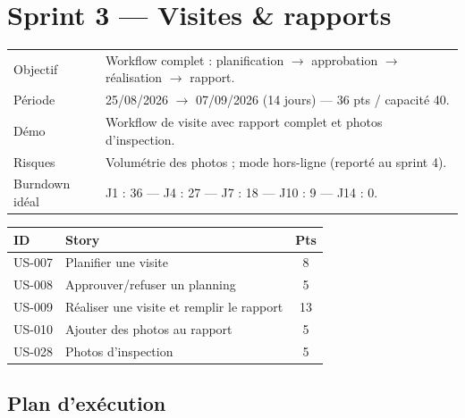 \section{Sprint 3 --- Visites \& rapports}

\begin{center}
\begin{tabular}{lp{11cm}}
\toprule
Objectif  & Workflow complet : planification $\rightarrow$ approbation
            $\rightarrow$ réalisation $\rightarrow$ rapport. \\
Période   & 25/08/2026 $\rightarrow$ 07/09/2026 (14 jours) --- 36 pts / capacité 40. \\
Démo      & Workflow de visite avec rapport complet et photos d'inspection. \\
Risques   & Volumétrie des photos ; mode hors-ligne (reporté au sprint 4). \\
Burndown idéal & J1 : 36 --- J4 : 27 --- J7 : 18 --- J10 : 9 --- J14 : 0. \\
\bottomrule
\end{tabular}
\end{center}

\begin{center}
\begin{tabular}{lp{9cm}c}
\toprule
\textbf{ID} & \textbf{Story} & \textbf{Pts} \\
\midrule
US-007 & Planifier une visite                        & 8 \\
US-008 & Approuver/refuser un planning               & 5 \\
US-009 & Réaliser une visite et remplir le rapport   & 13 \\
US-010 & Ajouter des photos au rapport               & 5 \\
US-028 & Photos d'inspection                         & 5 \\
\bottomrule
\end{tabular}
\end{center}

\subsection{Plan d'exécution}

